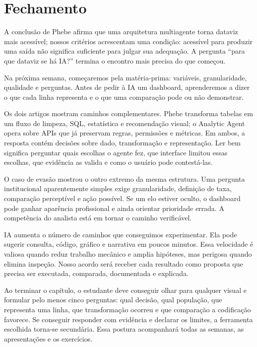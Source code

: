 \section{Fechamento}

A conclusão de Phebe afirma que uma arquitetura multiagente torna dataviz mais acessível; nossos critérios acrescentam uma condição: acessível para produzir uma saída não significa suficiente para julgar sua adequação. A pergunta ``para que dataviz se há IA?'' termina o encontro mais precisa do que começou.

Na próxima semana, começaremos pela matéria-prima: variáveis, granularidade, qualidade e perguntas. Antes de pedir à IA um dashboard, aprenderemos a dizer o que cada linha representa e o que uma comparação pode ou não demonstrar.

Os dois artigos mostram caminhos complementares. Phebe transforma tabelas em um fluxo de limpeza, SQL, estatística e recomendação visual; o Analytic Agent opera sobre APIs que já preservam regras, permissões e métricas. Em ambos, a resposta contém decisões sobre dado, transformação e representação. Ler bem significa perguntar quais escolhas o agente fez, que interface limitou essas escolhas, que evidência as valida e como o usuário pode contestá-las.

O caso de evasão mostrou o outro extremo da mesma estrutura. Uma pergunta institucional aparentemente simples exige granularidade, definição de taxa, comparação perceptível e ação possível. Se um elo estiver oculto, o dashboard pode ganhar aparência profissional e ainda orientar prioridade errada. A competência do analista está em tornar o caminho verificável.

IA aumenta o número de caminhos que conseguimos experimentar. Ela pode sugerir consulta, código, gráfico e narrativa em poucos minutos. Essa velocidade é valiosa quando reduz trabalho mecânico e amplia hipóteses, mas perigosa quando elimina inspeção. Nosso acordo será receber cada resultado como proposta que precisa ser executada, comparada, documentada e explicada.

Ao terminar o capítulo, o estudante deve conseguir olhar para qualquer visual e formular pelo menos cinco perguntas: qual decisão, qual população, que representa uma linha, que transformação ocorreu e que comparação a codificação favorece. Se conseguir responder com evidência e declarar os limites, a ferramenta escolhida torna-se secundária. Essa postura acompanhará todas as semanas, as apresentações e os exercícios.

